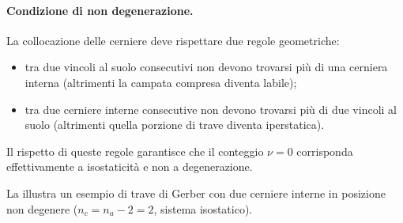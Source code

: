 \paragraph{Condizione di non degenerazione.}
La collocazione delle cerniere deve rispettare due
regole geometriche:
\begin{itemize}[noitemsep]
\item tra due vincoli al suolo consecutivi non
devono trovarsi più di una cerniera interna
(altrimenti la campata compresa diventa labile);
\item tra due cerniere interne consecutive non
devono trovarsi più di due vincoli al suolo
(altrimenti quella porzione di trave diventa
iperstatica).
\end{itemize}
Il rispetto di queste regole garantisce che il
conteggio $\nu = 0$ corrisponda effettivamente
a isostaticità e non a degenerazione.

La  illustra un esempio di trave
di Gerber con due cerniere interne in posizione non
degenere ($n_c = n_a - 2 = 2$, sistema isostatico).


